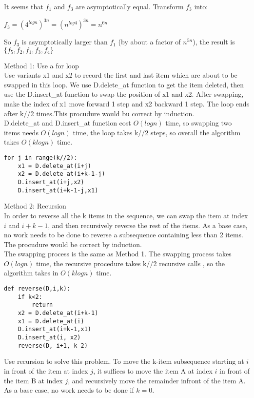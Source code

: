 \documentclass[12pt,twoside]{article}
\begin{document}
\begin{problems}
\begin{problemparts}
It seems that $f_1$ and $f_3$ are asymptotically equal. Transform $f_3$ into:

$f_3 = (4^{logn})^{3n}= (n^{log4})^{3n}=n^{6n}$

So $f_3$ is asymptotically larger than $f_1$ (by about a factor of $n^{5n}$), the result is $\{f_5,f_2,f_1,f_3,f_4\}$

\end{problemparts}

\newpage
\problem  %

\begin{problemparts}
\problempart %
Method 1: Use a for loop\\
Use variants x1 and x2 to record the first and last item which are about to be swapped in this loop. We use D.delete\_at function to get the item deleted, then use the D.insert\_at function to swap the position of x1 and x2. After swapping, make the index of x1 move forward 1 step and x2 backward 1 step. The loop ends after k//2 times.This procudure would bu correct by induction.\\
D.delete\_at and D.insert\_at function cost $O(logn)$ time, so swapping two items needs $O(logn)$ time, the loop takes k//2 steps, so overall the algorithm takes $O(klogn)$ time.\\
\begin{lstlisting}
for j in range(k//2):
    x1 = D.delete_at(i+j)
    x2 = D.delete_at(i+k-1-j)
    D.insert_at(i+j,x2)
    D.insert_at(i+k-1-j,x1)
\end{lstlisting}
Method 2: Recursion\\
In order to reverse all the k items in the sequence, we can swap the item at index $i$ and $i+k-1$, and then recursively reverse the rest of the items. As a base case, no work needs to be done to reverse a subsequence containing less than 2 items. The procudure would be correct by induction.\\
The swapping process is the same as Method 1. The swapping process takes $O(logn)$ time, the recursive procedure takes k//2 recursive calls , so the algorithm takes in $O(klogn)$ time.\\
\begin{lstlisting}
def reverse(D,i,k):
    if k<2:
        return
    x2 = D.delete_at(i+k-1)
    x1 = D.delete_at(i)
    D.insert_at(i+k-1,x1)
    D.insert_at(i, x2)
    reverse(D, i+1, k-2)
\end{lstlisting}
\problempart %
Use recursion to solve this problem. To move the k-item subsequence starting at $i$ in front of the item at index $j$, it suffices to move the item A at index $i$ in front of the item B at index $j$, and recursively move the remainder infront of the item A. As a base case, no work needs to be done if $k = 0$.\\

\end{problemparts}
\end{problems}
\end{document}
